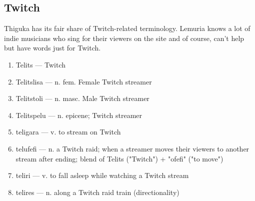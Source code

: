 \subsection{Twitch}
Thiguka has its fair share of Twitch-related terminology.
Lemuria knows a lot of indie musicians who sing for their viewers on the site and of course, can't help but have words just for Twitch.

\begin{multicols}{2} 
    \begin{enumerate}
        \item Telits --- Twitch
        \item Telitslisa --- n. fem. Female Twitch streamer
        \item Telitstoli --- n. masc. Male Twitch streamer
        \item Telitspelu --- n. epicene; Twitch streamer
        \item teligara --- v. to stream on Twitch
        \item telufefi --- n. a Twitch raid; when a streamer moves their viewers to another stream after ending; blend of Telits ("Twitch") + "ofefi" ("to move")
        \item teliri --- v. to fall asleep while watching a Twitch stream
        \item telires --- n. along a Twitch raid train (directionality)
    \end{enumerate}
\end{multicols}
